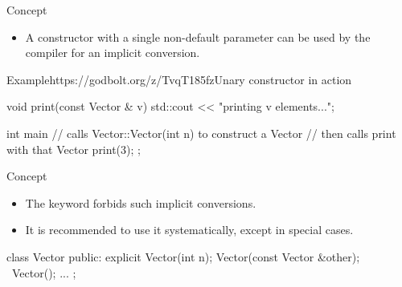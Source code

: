 \begin{frame}[fragile]
  \begin{block}{Concept}
    \begin{itemize}
    \item A constructor with a single non-default parameter can be used by the compiler for an implicit conversion.
    \end{itemize}
  \end{block}
  \begin{exampleblockGB}{Example}{https://godbolt.org/z/TvqT185fz}{Unary constructor in action}
    \begin{cppcode}
    void print(const Vector & v) {
      std::cout << "printing v elements...\n";
    }

    int main {
      // calls Vector::Vector(int n) to construct a Vector
      // then calls print with that Vector
      print(3);
    };
    \end{cppcode}
  \end{exampleblockGB}
\end{frame}

\begin{frame}[fragile]
  \begin{block}{Concept}
    \begin{itemize}
      \item The keyword  forbids such implicit conversions.
      \item It is recommended to use it systematically, except in special cases.
    \end{itemize}
  \end{block}
  \begin{cppcode}
    class Vector {
    public:
      explicit Vector(int n);
      Vector(const Vector &other);
      ~Vector();
      ...
    };
  \end{cppcode}
\end{frame}

